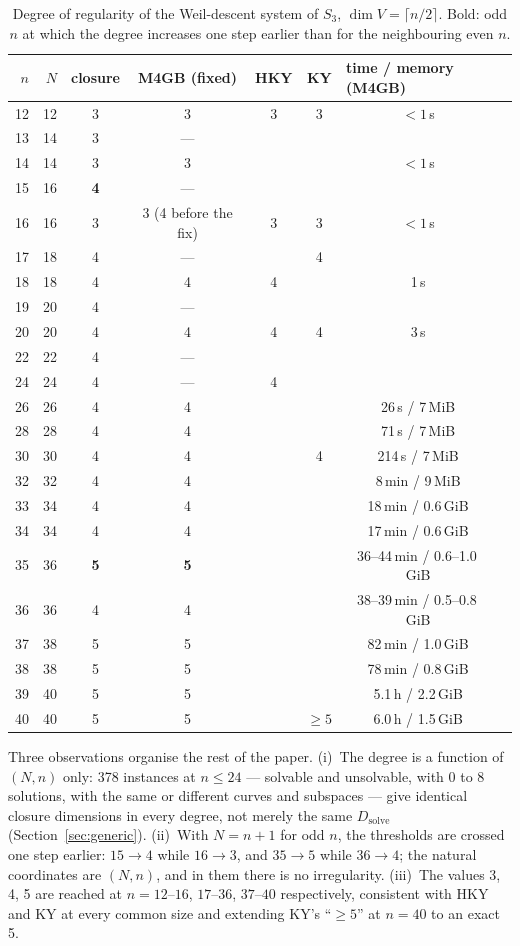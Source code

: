 \documentclass[11pt,a4paper]{article}
\theoremstyle{remark}\newtheorem{remark}{Remark}
\newcommand{\Dsolve}{D_{\mathrm{solve}}}
\begin{document}
\begin{table}[ht]\centering\small
\caption{Degree of regularity of the Weil-descent system of $S_3$, $\dim V=\lceil n/2\rceil$. Bold: odd $n$ at which the degree increases one step earlier than for the neighbouring even $n$.}\label{tab:square}
\begin{tabular}{rrcccccl}
\toprule
$n$ & $N$ & closure & M4GB (fixed) & HKY & KY & \multicolumn{2}{l}{time / memory (M4GB)}\\
\midrule
12 & 12 & 3 & 3 & 3 & 3 & $<1$\,s\\
13 & 14 & 3 & --- & & & \\
14 & 14 & 3 & 3 & & & $<1$\,s\\
15 & 16 & \textbf{4} & --- & & & \\
16 & 16 & 3 & 3 (4 before the fix) & 3 & 3 & $<1$\,s\\
17 & 18 & 4 & --- & & 4 & \\
18 & 18 & 4 & 4 & 4 & & 1\,s\\
19 & 20 & 4 & --- & & & \\
20 & 20 & 4 & 4 & 4 & 4 & 3\,s\\
22 & 22 & 4 & --- & & & \\
24 & 24 & 4 & --- & 4 & & \\
26 & 26 & 4 & 4 & & & 26\,s / 7\,MiB\\
28 & 28 & 4 & 4 & & & 71\,s / 7\,MiB\\
30 & 30 & 4 & 4 & & 4 & 214\,s / 7\,MiB\\
32 & 32 & 4 & 4 & & & 8\,min / 9\,MiB\\
33 & 34 & 4 & 4 & & & 18\,min / 0.6\,GiB\\
34 & 34 & 4 & 4 & & & 17\,min / 0.6\,GiB\\
35 & 36 & \textbf{5} & \textbf{5} & & & 36--44\,min / 0.6--1.0\,GiB\\
36 & 36 & 4 & 4 & & & 38--39\,min / 0.5--0.8\,GiB\\
37 & 38 & 5 & 5 & & & 82\,min / 1.0\,GiB\\
38 & 38 & 5 & 5 & & & 78\,min / 0.8\,GiB\\
39 & 40 & 5 & 5 & & & 5.1\,h / 2.2\,GiB\\
40 & 40 & 5 & 5 & & $\ge5$ & 6.0\,h / 1.5\,GiB\\
\bottomrule
\end{tabular}
\end{table}

Three observations organise the rest of the paper. (i)~The degree is a function of $(N,n)$ only: 378 instances at $n\le24$ --- solvable and unsolvable, with 0 to 8 solutions, with the same or different curves and subspaces --- give identical closure dimensions in every degree, not merely the same $\Dsolve$ (Section~\ref{sec:generic}). (ii)~With $N=n+1$ for odd $n$, the thresholds are crossed one step earlier: $15\to4$ while $16\to3$, and $35\to5$ while $36\to4$; the natural coordinates are $(N,n)$, and in them there is no irregularity. (iii)~The values 3, 4, 5 are reached at $n=12$--$16$, $17$--$36$, $37$--$40$ respectively, consistent with HKY and KY at every common size and extending KY's ``$\ge5$'' at $n=40$ to an exact 5.
\end{document}
